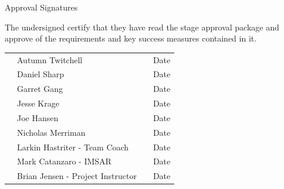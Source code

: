 \documentclass[letterpaper, 11pt, twoside, article]{memoir}
\begin{document}
\begin {centering}
{\LARGE Approval Signatures}

\vspace{.5in}

The undersigned certify that they have read the stage approval package and approve of the requirements and key success measures contained in it.


\end{centering}
\vspace{.5 in}			
\begin{tabularx}{\textwidth}{C{.25 in} L{2.5 in} C{.5 in} R{1.5 in}}
 

& Autumn Twitchell & & Date \vspace{.25 in}\\
 
& Daniel Sharp & & Date \vspace {.25 in}\\
 
& Garret Gang & & Date \vspace{.25 in}\\
 
& Jesse Krage & & Date \vspace{.25 in}\\
 
& Joe Hansen & & Date \vspace{.25 in}\\
 
& Nicholas Merriman & & Date \vspace{.25 in}\\
 
&  Larkin Hastriter - Team Coach & & Date \vspace{.25 in}\\
 
& Mark Catanzaro - IMSAR & & Date \vspace{.25 in}\\
 
& Brian Jensen - Project Instructor & & Date \vspace{0 in}\\

\end{tabularx}

\vspace{1 in}

\clearpage

\tableofcontents*


\mainmatter

\end{document}

